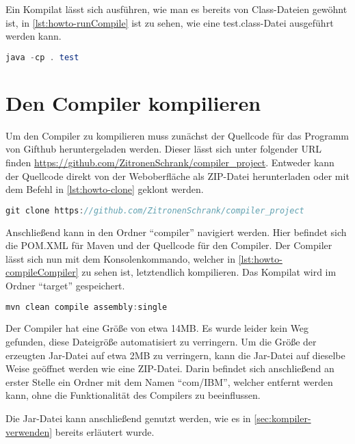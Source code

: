Ein Kompilat lässt sich ausführen, wie man es bereits von Class-Dateien gewöhnt ist, in \cref{lst:howto-runCompile} ist zu sehen, wie eine test.class-Datei ausgeführt werden kann. 

\begin{lstlisting}[language=java, caption=Ein programm ausführen, label={lst:howto-runCompile}]
	java -cp . test
\end{lstlisting}

\section{Den Compiler kompilieren} \label{sec:compileCompiler}

Um den Compiler zu kompilieren muss zunächst der Quellcode für das Programm von Gifthub heruntergeladen werden. Dieser lässt sich unter folgender URL finden \url{https://github.com/ZitronenSchrank/compiler_project}. Entweder kann der Quellcode direkt von der Weboberfläche als ZIP-Datei herunterladen oder mit dem Befehl in \cref{lst:howto-clone} geklont werden.

\begin{lstlisting}[language=java, caption=Das Repository klonen, label={lst:howto-clone}]
git clone https://github.com/ZitronenSchrank/compiler_project
\end{lstlisting}

Anschließend kann in den Ordner \enquote{compiler} navigiert werden. Hier befindet sich die POM.XML für Maven und der Quellcode für den Compiler. Der Compiler lässt sich nun mit dem Konsolenkommando, welcher in \cref{lst:howto-compileCompiler} zu sehen ist, letztendlich kompilieren. Das Kompilat wird im Ordner \enquote{target} gespeichert.

\begin{lstlisting}[language=java, caption=Mit Maven den Compiler compilieren, label={lst:howto-compileCompiler}]
	mvn clean compile assembly:single
\end{lstlisting}

Der Compiler hat eine Größe von etwa 14MB. Es wurde leider kein Weg gefunden, diese Dateigröße automatisiert zu verringern. Um die Größe der erzeugten Jar-Datei auf etwa 2MB zu verringern, kann die Jar-Datei auf dieselbe Weise geöffnet werden wie eine ZIP-Datei. Darin befindet sich anschließend an erster Stelle ein Ordner mit dem Namen \enquote{com/IBM}, welcher entfernt werden kann, ohne die Funktionalität des Compilers zu beeinflussen.

Die Jar-Datei kann anschließend genutzt werden, wie es in \cref{sec:kompiler-verwenden} bereits erläutert wurde.

